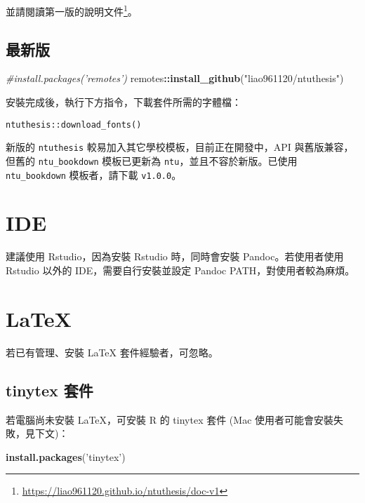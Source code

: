 \documentclass[oneside]{book}
\newenvironment{Shaded}{\begin{snugshade}}{\end{snugshade}}
\newcommand{\CommentTok}[1]{\textcolor[rgb]{0.56,0.35,0.01}{\textit{#1}}}
\newcommand{\KeywordTok}[1]{\textcolor[rgb]{0.13,0.29,0.53}{\textbf{#1}}}
\newcommand{\NormalTok}[1]{#1}
\newcommand{\OperatorTok}[1]{\textcolor[rgb]{0.81,0.36,0.00}{\textbf{#1}}}
\newcommand{\StringTok}[1]{\textcolor[rgb]{0.31,0.60,0.02}{#1}}
\renewcommand{\href}[2]{#2\footnote{\url{#1}}}
\begin{document}
並請閱讀\href{https://liao961120.github.io/ntuthesis/doc-v1}{第一版的說明文件}。

\hypertarget{ux6700ux65b0ux7248}{%
\subsection*{最新版}\label{ux6700ux65b0ux7248}}

\begin{Shaded}
\begin{Highlighting}[]
\CommentTok{#install.packages('remotes')}
\NormalTok{remotes}\OperatorTok{::}\KeywordTok{install_github}\NormalTok{(}\StringTok{"liao961120/ntuthesis"}\NormalTok{)}
\end{Highlighting}
\end{Shaded}

安裝完成後，執行下方指令，下載套件所需的字體檔：

\begin{verbatim}
ntuthesis::download_fonts()
\end{verbatim}

新版的 \texttt{ntuthesis} 較易加入其它學校模板，目前正在開發中，API 與舊版兼容，但舊的 \texttt{ntu\_bookdown} 模板已更新為 \texttt{ntu}，並且不容於新版。已使用 \texttt{ntu\_bookdown} 模板者，請下載 \texttt{v1.0.0}。

\hypertarget{ide}{%
\section{IDE}\label{ide}}

建議使用 Rstudio，因為安裝 Rstudio 時，同時會安裝 Pandoc。若使用者使用 Rstudio 以外的 IDE，需要自行安裝並設定 Pandoc PATH，對使用者較為麻煩。

\hypertarget{latex}{%
\section{LaTeX}\label{latex}}

若已有管理、安裝 LaTeX 套件經驗者，可忽略。

\hypertarget{tinytex-ux5957ux4ef6}{%
\subsection{tinytex 套件}\label{tinytex-ux5957ux4ef6}}

若電腦尚未安裝 LaTeX，可安裝 R 的 tinytex 套件 (Mac 使用者可能會安裝失敗，見下文)：

\begin{Shaded}
\begin{Highlighting}[]
\KeywordTok{install.packages}\NormalTok{(}\StringTok{'tinytex'}\NormalTok{)}
\end{Highlighting}
\end{Shaded}
\end{document}
